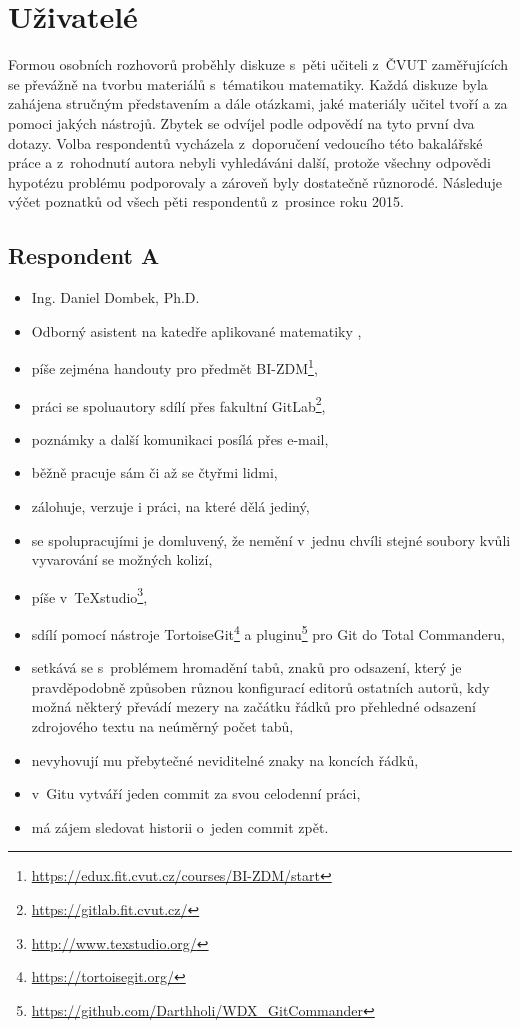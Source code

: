 \section{Uživatelé}

Formou osobních rozhovorů proběhly diskuze s~pěti učiteli z~ČVUT zaměřujících se převážně na tvorbu materiálů s~tématikou matematiky. Každá diskuze byla zahájena stručným představením a dále otázkami, jaké materiály učitel tvoří a za pomoci jakých nástrojů. Zbytek se odvíjel podle odpovědí na tyto první dva dotazy. Volba respondentů vycházela z~doporučení vedoucího této bakalářské práce a z~rohodnutí autora nebyli vyhledáváni další, protože všechny odpovědi hypotézu problému podporovaly a zároveň byly dostatečně různorodé. Následuje výčet poznatků od všech pěti respondentů z~prosince roku 2015.

\subsection{Respondent A}

\begin{itemize}
	\item Ing. Daniel Dombek, Ph.D.
	\item Odborný asistent na katedře aplikované matematiky \cite{kam},
	\item píše zejména handouty pro předmět BI-ZDM\footnote{\url{https://edux.fit.cvut.cz/courses/BI-ZDM/start}},
	\item práci se spoluautory sdílí přes fakultní GitLab\footnote{\url{https://gitlab.fit.cvut.cz/}},
	\item poznámky a další komunikaci posílá přes e-mail,
	\item běžně pracuje sám či až se čtyřmi lidmi,
	\item zálohuje, verzuje i práci, na které dělá jediný,
	\item se spolupracujími je domluvený, že nemění v~jednu chvíli stejné soubory kvůli vyvarování se možných kolizí,
	\item píše v~TeXstudio\footnote{\url{http://www.texstudio.org/}},
	\item sdílí pomocí nástroje TortoiseGit\footnote{\url{https://tortoisegit.org/}} a pluginu\footnote{\url{https://github.com/Darthholi/WDX\_GitCommander}} pro Git do Total Commanderu,
	\item setkává se s~problémem hromadění tabů, znaků pro odsazení, který je pravděpodobně způsoben různou konfigurací editorů ostatních autorů, kdy možná některý převádí mezery na začátku řádků pro přehledné odsazení zdrojového textu na neúměrný počet tabů,
	\item nevyhovují mu přebytečné neviditelné znaky na koncích řádků,
	\item v~Gitu vytváří jeden commit za svou celodenní práci,
	\item má zájem sledovat historii o~jeden commit zpět.
\end{itemize}


